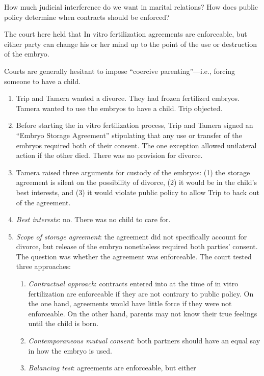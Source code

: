 How much judicial interference do we want in marital relations? How does 
public policy determine when contracts should be enforced?

The court here held that In vitro fertilization agreements are enforceable, 
but either party can change his or her mind up to the point of the use or 
destruction of the embryo.

Courts are generally hesitant to impose ``coercive parenting''---i.e., forcing 
someone to have a child.

\begin{enumerate}
    \item Trip and Tamera wanted a divorce. They had frozen fertilized 
    embryos. Tamera wanted to use the embryos to have a child. Trip objected.
    \item Before starting the in vitro fertilization process, Trip and Tamera 
    signed an ``Embryo Storage Agreement'' stipulating that any use or 
    transfer of the embryos required both of their consent. The one exception 
    allowed unilateral action if the other died. There was no provision for 
    divorce.
    \item Tamera raised three arguments for custody of the embryos: (1) the 
    storage agreement is silent on the possibility of divorce, (2) it would be 
    in the child's best interests, and (3) it would violate public policy to 
    allow Trip to back out of the agreement.
    \item \emph{Best interests}: no. There was no child to care for.
    \item \emph{Scope of storage agreement}: the agreement did not 
    specifically account for divorce, but release of the embryo nonetheless 
    required both parties' consent. The question was whether the agreement was 
    enforceable. The court tested three approaches:
    \begin{enumerate}
        \item \emph{Contractual approach}: contracts entered into at the time 
        of in vitro fertilization are enforceable if they are not contrary to 
        public policy. On the one hand, agreements would have little force if 
        they were not enforceable. On the other hand, parents may not know 
        their true feelings until the child is born.
        \item \emph{Contemporaneous mutual consent}: both partners should have 
        an equal say in how the embryo is used.
        \item \emph{Balancing test}: agreements are enforceable, but either 

\end{enumerate}
\end{enumerate}
